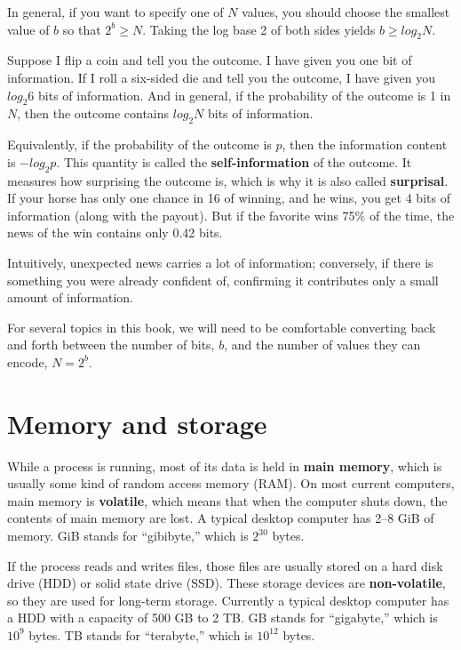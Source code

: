 \documentclass[12pt]{book}
\begin{document}
{In general, if you want to specify one of $N$ values, you should
choose the smallest value of $b$ so that $2^b \ge N$.  Taking the
log base 2 of both sides yields $b \ge log_2 N$.

Suppose I flip a coin and tell you the outcome.  I have given
you one bit of information.  If I roll a six-sided die and tell
you the outcome, I have given you $log_2 6$ bits of information.
And in general, if the probability of the outcome is 1 in $N$,
then the outcome contains $log_2 N$ bits of information.

Equivalently, if the probability of the outcome is $p$, then
the information content is $-log_2 p$.  This quantity is called
the {\bf self-information} of the outcome.  It measures
how surprising the outcome is, which is why it is also called
{\bf surprisal}.  If your horse has only one chance in 16 of winning,
and he wins, you get 4 bits of information (along with the
payout).  But if the favorite wins 75\% of the time, the news
of the win contains only 0.42 bits.

Intuitively, unexpected news carries a lot of
information; conversely, if there is something you were already confident
of, confirming it contributes only a small amount of information.

For several topics in this book, we will need to be comfortable
converting back and forth between the number of bits, $b$, and the
number of values they can encode, $N = 2^b$.


\section{Memory and storage}

While a process is running, most of its data is held in {\bf main
memory}, which is usually some kind of random access memory (RAM).
On most current computers, main memory is {\bf volatile}, which means that
when the computer shuts down, the contents of main memory are lost.
A typical desktop computer has 2--8 GiB of
memory.  GiB stands for ``gibibyte,'' which is $2^{30}$ bytes.  

If the process reads and writes files, those files are usually stored
on a hard disk drive (HDD) or solid state drive (SSD).  These storage
devices are {\bf non-volatile}, so they are used for long-term storage.
Currently a typical desktop computer has a HDD with a capacity of 500
GB to 2 TB.  GB stands for ``gigabyte,'' which is $10^9$ bytes.  TB
stands for ``terabyte,'' which is $10^{12}$ bytes.

}
\end{document}
